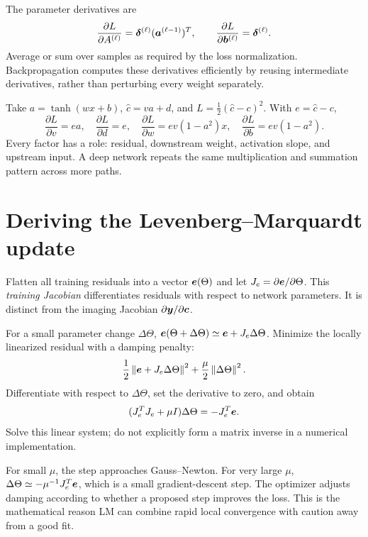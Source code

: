 The parameter derivatives are
\begin{equation}
\frac{\partial L}{\partial A^{(\ell)}}=
\bm{\delta}^{(\ell)}(\bm{a}^{(\ell-1)})^T,\qquad
\frac{\partial L}{\partial\bm{b}^{(\ell)}}=\bm{\delta}^{(\ell)}.
\label{eq:networkgrad}
\end{equation}
Average or sum over samples as required by the loss normalization.
Backpropagation computes these derivatives efficiently by reusing
intermediate derivatives, rather than perturbing every weight separately.

Take $a=\tanh(wx+b)$, $\hat c=va+d$, and
$L=\tfrac12(\hat c-c)^2$.
With $e=\hat c-c$,
\[
\frac{\partial L}{\partial v}=ea,\quad
\frac{\partial L}{\partial d}=e,\quad
\frac{\partial L}{\partial w}=ev(1-a^2)x,\quad
\frac{\partial L}{\partial b}=ev(1-a^2).
\]
Every factor has a role: residual, downstream weight, activation slope,
and upstream input. A deep network repeats the same multiplication and
summation pattern across more paths.

\section{Deriving the Levenberg--Marquardt update}
Flatten all training residuals into a vector $\bm{e}(\Theta)$ and let
$J_e=\partial\bm{e}/\partial\Theta$.
This \emph{training Jacobian} differentiates residuals with respect to
network parameters. It is distinct from the imaging Jacobian
$\partial\bm{y}/\partial\bm{c}$.

For a small parameter change $\Delta\Theta$,
$\bm{e}(\Theta+\Delta\Theta)\simeq\bm{e}+J_e\Delta\Theta$.
Minimize the locally linearized residual with a damping penalty:
\[
\frac12\left\lVert\bm{e}+J_e\Delta\Theta\right\rVert^2
+\frac{\mu}{2}\left\lVert\Delta\Theta\right\rVert^2.
\]
Differentiate with respect to $\Delta\Theta$, set the derivative to zero,
and obtain
\begin{equation}
(J_e^TJ_e+\mu I)\Delta\Theta=-J_e^T\bm{e}.
\label{eq:LM}
\end{equation}
Solve this linear system; do not explicitly form a matrix inverse
in a numerical implementation.

For small $\mu$, the step approaches Gauss--Newton.
For very large $\mu$,
$\Delta\Theta\simeq-\mu^{-1}J_e^T\bm{e}$,
which is a small gradient-descent step.
The optimizer adjusts damping according to whether a proposed step
improves the loss. This is the mathematical reason LM can combine
rapid local convergence with caution away from a good fit.

